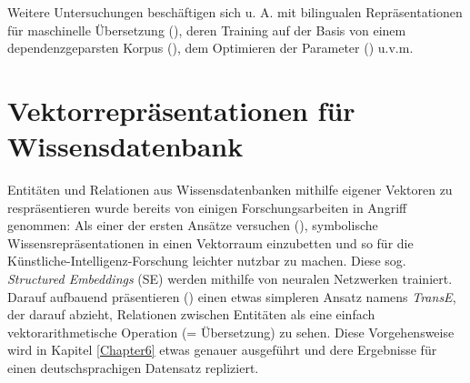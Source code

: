 Weitere Untersuchungen beschäftigen sich u. A. mit bilingualen Repräsentationen für maschinelle Übersetzung (\cite{zou2013bilingual}),
deren Training auf der Basis von einem dependenzgeparsten Korpus (\cite{levy2014dependency}), dem Optimieren der Parameter
(\cite{levy2015improving}) u.v.m.


\section{Vektorrepräsentationen für Wissensdatenbank}

Entitäten und Relationen aus Wissensdatenbanken mithilfe eigener Vektoren zu respräsentieren wurde bereits von einigen
Forschungsarbeiten in Angriff genommen: Als einer der ersten Ansätze versuchen (\cite{bordes2011learning}), symbolische
Wissensrepräsentationen in einen Vektorraum einzubetten und so für die Künstliche-Intelligenz-Forschung leichter nutzbar
zu machen. Diese sog. \emph{Structured Embeddings} (SE) werden mithilfe von neuralen Netzwerken trainiert.
Darauf aufbauend präsentieren (\cite{bordes2013translating}) einen etwas simpleren Ansatz namens \emph{TransE}, der darauf abzieht, Relationen
zwischen Entitäten als eine einfach vektorarithmetische Operation (= Übersetzung) zu sehen. Diese Vorgehensweise wird in Kapitel \ref{Chapter6}
etwas genauer ausgeführt und dere Ergebnisse für einen deutschsprachigen Datensatz repliziert.\\

